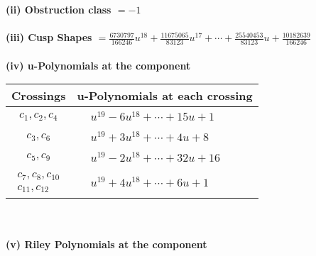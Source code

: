 \documentclass[1p]{elsarticle_modified}
\theoremstyle{definition}
\begin{document}
\flushleft \textbf{(ii) Obstruction class $= -1$}\\~\\
\flushleft \textbf{(iii) Cusp Shapes $= \frac{6730797}{166246} u^{18}+\frac{11675065}{83123} u^{17}+\cdots+\frac{25540453}{83123} u+\frac{10182639}{166246}$}\\~\\
\newpage\renewcommand{\arraystretch}{1}
\flushleft \textbf{(iv) u-Polynomials at the component}\newline \\
\begin{tabular}{m{50pt}|m{274pt}}
Crossings & \hspace{64pt}u-Polynomials at each crossing \\
\hline $$\begin{aligned}c_{1},c_{2},c_{4}\end{aligned}$$&$\begin{aligned}
&u^{19}-6 u^{18}+\cdots+15 u+1
\end{aligned}$\\
\hline $$\begin{aligned}c_{3},c_{6}\end{aligned}$$&$\begin{aligned}
&u^{19}+3 u^{18}+\cdots+4 u+8
\end{aligned}$\\
\hline $$\begin{aligned}c_{5},c_{9}\end{aligned}$$&$\begin{aligned}
&u^{19}-2 u^{18}+\cdots+32 u+16
\end{aligned}$\\
\hline $$\begin{aligned}c_{7},c_{8},c_{10}\\c_{11},c_{12}\end{aligned}$$&$\begin{aligned}
&u^{19}+4 u^{18}+\cdots+6 u+1
\end{aligned}$\\
\hline
\end{tabular}\\~\\
\newpage\renewcommand{\arraystretch}{1}
\flushleft \textbf{(v) Riley Polynomials at the component}\newline \\
\end{document}

